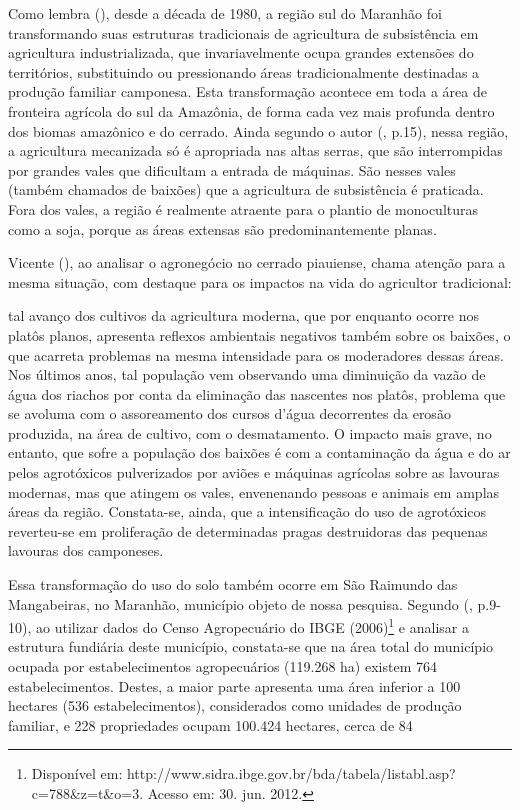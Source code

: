 Como lembra  (\citeyear{studte2008}), desde a década de 1980, a região sul do Maranhão foi transformando suas estruturas tradicionais de agricultura de subsistência em agricultura industrializada, que invariavelmente ocupa grandes extensões do territórios, substituindo ou pressionando áreas tradicionalmente destinadas a produção familiar camponesa. Esta transformação acontece em toda a área de fronteira agrícola do sul da Amazônia, de forma cada vez mais profunda dentro dos biomas amazônico e do cerrado. Ainda segundo o autor (\citeyear{studte2008}, p.15), nessa região, a agricultura mecanizada só é apropriada nas altas serras, que são interrompidas por grandes vales que dificultam a entrada de máquinas.  São nesses vales (também chamados de baixões) que a agricultura de subsistência é praticada. Fora dos vales, a região é realmente atraente para o plantio de monoculturas como a soja, porque as áreas extensas são predominantemente planas. 

Vicente  (\citeyear{alves2006}), ao analisar o agronegócio no cerrado piauiense, chama atenção para a mesma situação, com destaque para os impactos na vida do agricultor tradicional:

\begin{citacao}
tal avanço dos cultivos da agricultura moderna, que por enquanto ocorre nos platôs planos, apresenta reflexos ambientais negativos também sobre os baixões, o que acarreta problemas na mesma intensidade para os moderadores dessas áreas. Nos últimos anos, tal população vem observando uma diminuição da vazão de água dos riachos por conta da eliminação das nascentes nos platôs, problema que se avoluma com o assoreamento dos cursos d'água decorrentes da erosão produzida, na área de cultivo, com o desmatamento. O impacto mais grave, no entanto, que sofre a população dos baixões é com a contaminação da água e do ar pelos agrotóxicos pulverizados por aviões e máquinas agrícolas sobre as lavouras modernas, mas que atingem os vales, envenenando pessoas e animais em amplas áreas da região. Constata-se, ainda, que a intensificação do uso de agrotóxicos reverteu-se em proliferação de determinadas pragas destruidoras das pequenas lavouras dos camponeses. \cite[p. 278-279]{alves2006}
\end{citacao}


Essa transformação do uso do solo também ocorre em São Raimundo das Mangabeiras, no Maranhão, município objeto de nossa pesquisa. Segundo  (\citeyear{lima_locatel_silva}, p.9-10), ao utilizar dados do Censo Agropecuário do IBGE (2006)\footnote{Disponível em:
http://www.sidra.ibge.gov.br/bda/tabela/listabl.asp?c=788\&z=t\&o=3. Acesso em: 30. jun. 2012.} e analisar a estrutura fundiária deste município, constata-se que na área total do município ocupada por estabelecimentos agropecuários (119.268 ha) existem 764 estabelecimentos. Destes, a maior parte apresenta uma área inferior a 100 hectares (536 estabelecimentos), considerados como unidades de produção familiar, e 228 propriedades ocupam 100.424 hectares, cerca de 84%

